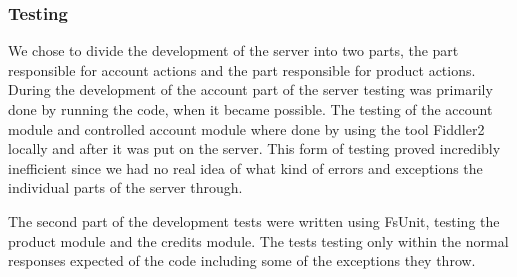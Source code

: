 \subsubsection{Testing}
We chose to divide the development of the server into two parts, the part responsible for account actions and the part responsible for product actions. During the development of the account part of the server testing was primarily done by running the code, when it became possible. The testing of the account module and controlled account module where done by using the tool Fiddler2 locally and after it was put on the server. This form of testing proved incredibly inefficient since we had no real idea of what kind of errors and exceptions the individual parts of the server through.

The second part of the development tests were written using FsUnit, testing the product module and the credits module. The tests testing only within the normal responses expected of the code including some of the exceptions they throw.